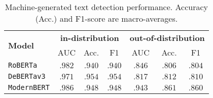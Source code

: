 \begin{table}[t]
\centering
\small
\setlength{\tabcolsep}{4pt}
\begin{tabular}{lcccccc}
\toprule
\multirow{2}{*}{\bf Model}& \multicolumn{3}{c}{\bf in-distribution} & \multicolumn{3}{c}{\bf out-of-distribution}\\
& AUC & Acc. & F1 & AUC & Acc. & F1 \\
\midrule
\texttt{RoBERTa}      & $.982$ & $.940$ & $.940$ & $.846$ & $.806$ & $.804$\\
\texttt{DeBERTav3}    & $.971$ & $\mathbf{.954}$ & $\mathbf{.954}$ & $.817$ & $.812$ & $.810$ \\
\texttt{ModernBERT}   & $\mathbf{.986}$ & $.948$ & $.948$ & $\mathbf{.943}$ & $\mathbf{.861}$ & $\mathbf{.860}$ \\
\bottomrule
\end{tabular}
\caption{Machine-generated text detection performance. Accuracy (Acc.) and F1-score are macro-averages.}
\label{tab:ai_detectors}
\end{table}